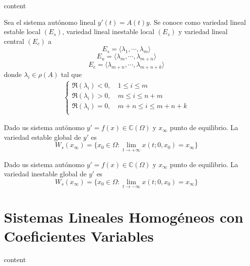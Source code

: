 \begin{defn}
  content
\end{defn}

\begin{defn}
  Sea el sistema autónomo lineal $y'(t) = A(t) y$. Se conoce como variedad lineal estable local $(E_{s})$, variedad lineal inestable local $(E_{s})$ y variedad lineal central $(E_{c})$ a
  \[ 
    E_{s} = \langle \lambda_{1}, \cdots, \lambda_{m} \rangle
  \] 
  \[ 
    E_{u} = \langle \lambda_{m}, \cdots, \lambda_{m + n} \rangle
  \] 
  \[ 
    E_{c} = \langle \lambda_{m + n}, \cdots, \lambda_{m + n + k} \rangle
  \] 
  donde $\lambda_{i} \in \rho(A)$ tal que
  \[ 
    \begin{aligned}
      \begin{cases}
        \Re(\lambda_{i}) < 0, \quad 1 \leq i \leq m \\
        \Re(\lambda_{i}) > 0, \quad m \leq i \leq n + m \\
        \Re(\lambda_{i}) = 0, \quad m + n \leq i \leq m + n + k \\
      \end{cases}
    \end{aligned} 
  \] 
\end{defn}

\begin{defn}
  Dado us sistema autónomo $y' = f(x) \in \mathbb{C}(\Omega)$ y $x_{\infty}$ punto de equilibrio. La variedad estable global de $y'$ es 
  \[ 
    W_{s}(x_{\infty})  = \{ x_{0} \in \Omega : \lim_{t \to +\infty} x(t; 0, x_{0}) = x_{\infty} \}
  \] 
\end{defn}

\begin{defn}
  Dado us sistema autónomo $y' = f(x) \in \mathbb{C}(\Omega)$ y $x_{\infty}$ punto de equilibrio. La variedad inestable global de $y'$ es 
  \[ 
    W_{s}(x_{\infty})  = \{ x_{0} \in \Omega : \lim_{t \to -\infty} x(t; 0, x_{0}) = x_{\infty} \}
  \] 
\end{defn}

\section{Sistemas Lineales Homogéneos con Coeficientes Variables}

\begin{obs}
  content
\end{obs}

